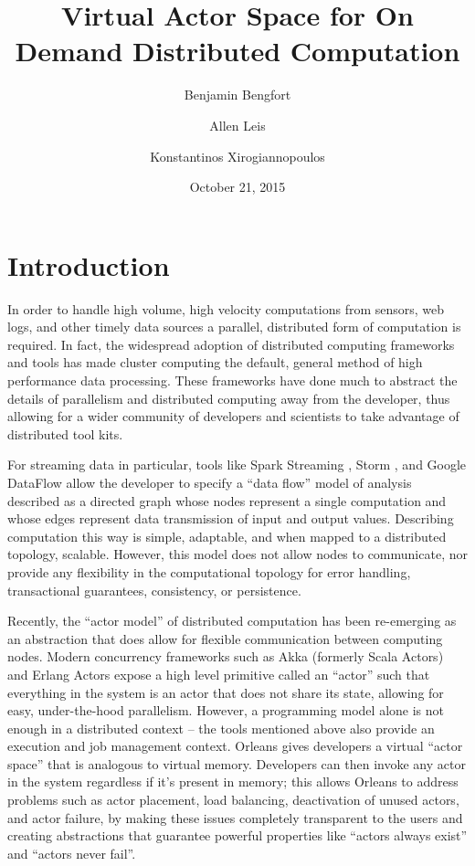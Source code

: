 \documentclass[11pt,letterpaper]{article}
\begin{document}
\title{Virtual Actor Space for On Demand Distributed Computation}
\author[1]{Benjamin Bengfort}
\author[2]{Allen Leis}
\author[1]{Konstantinos Xirogiannopoulos}

\date{October 21, 2015}

\maketitle
\section*{Introduction}

In order to handle high volume, high velocity computations from sensors, web logs, and other timely data sources a parallel, distributed form of computation is required. In fact, the widespread adoption of distributed computing frameworks and tools has made cluster computing the default, general method of high performance data processing. These frameworks have done much to abstract the details of parallelism and distributed computing away from the developer, thus allowing for a wider community of developers and scientists to take advantage of distributed tool kits.

For streaming data in particular, tools like Spark Streaming \cite{zaharia2012discretized}, Storm \cite{toshniwal2014storm}, and Google DataFlow \cite{akidau2015dataflow} allow the developer to specify a ``data flow'' model of analysis described as a directed graph whose nodes represent a single computation and whose edges represent data transmission of input and output values. Describing computation this way is simple, adaptable, and when mapped to a distributed topology, scalable. However, this model does not allow nodes to communicate, nor provide any flexibility in the computational topology for error handling, transactional guarantees, consistency, or persistence.

Recently, the ``actor model'' \cite{hewitt1973universal} of distributed computation has been re-emerging as an abstraction that does allow for flexible communication between computing nodes. Modern concurrency frameworks such as Akka (formerly Scala Actors) \cite{karmani2009actor} and Erlang Actors \cite{vinoski2007concurrency} expose a high level primitive called an ``actor'' such that everything in the system is an actor that does not share its state, allowing for easy, under-the-hood parallelism. However, a programming model alone is not enough in a distributed context -- the tools mentioned above also provide an execution and job management context. Orleans \cite{bernstein_orleans_2015} gives developers a virtual ``actor space'' that is analogous to virtual memory. Developers can then invoke any actor in the system regardless if it's present in memory; this allows Orleans to address problems such as actor placement, load balancing, deactivation of unused actors, and actor failure, by making these issues completely transparent to the users and creating abstractions that guarantee powerful properties like ``actors always exist'' and ``actors never fail''.
\end{document}
